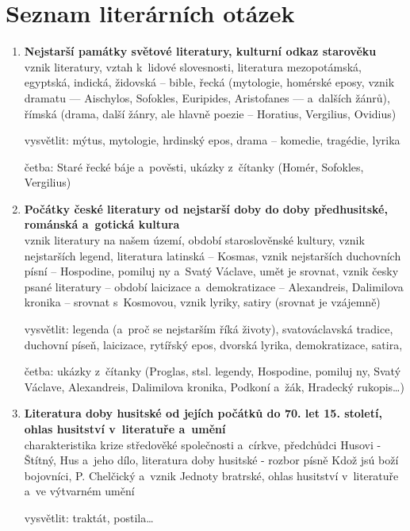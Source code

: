 \onecolumn
\chapter{Seznam literárních otázek} 
\begin{enumerate} 
\item \textbf{Nejstarší památky světové literatury, kulturní odkaz starověku} \\ 
vznik literatury, vztah k~lidové slovesnosti, literatura mezopotámská, 
egyptská, indická, židovská -- bible, řecká (mytologie, homérské eposy, 
vznik dramatu --- Aischylos, Sofokles, Euripides, Aristofanes ---
a~dalších žánrů), římská (drama, další žánry, ale hlavně poezie --
Horatius, Vergilius, Ovidius)

vysvětlit: mýtus, mytologie, hrdinský epos, drama -- komedie, tragédie, 
lyrika 

četba: Staré řecké báje a~pověsti, ukázky z~čítanky (Homér, Sofokles, 
Vergilius)

\item \textbf{Počátky české literatury od nejstarší doby do doby předhusitské, románská a~gotická kultura} \\ 
vznik literatury na našem území, období staroslověnské kultury, vznik
nejstarších legend, literatura latinská -- Kosmas, vznik  nejstarších
duchovních písní -- Hospodine, pomiluj ny a~Svatý Václave, umět je
srovnat, vznik česky psané literatury -- období laicizace a~demokratizace
-- Alexandreis, Dalimilova kronika -- srovnat s~Kosmovou, vznik lyriky, 
satiry (srovnat je vzájemně)

vysvětlit: legenda (a~proč se nejstarším říká životy), svatováclavská
tradice, duchovní píseň, laicizace, rytířský epos, dvorská
lyrika, demokratizace, satira, 

četba: ukázky z~čítanky (Proglas, stsl. legendy, Hospodine, pomiluj
ny, Svatý Václave, Alexandreis, Dalimilova kronika, Podkoní a~žák, 
Hradecký rukopis\dots )

\item \textbf{Literatura doby husitské od jejích počátků do 70. let 15. století, ohlas husitství v~literatuře a~umění} \\ 
charakteristika krize středověké společnosti a~církve, předchůdci
Husovi - Štítný, Hus a~jeho dílo, literatura doby husitské - rozbor
písně Kdož jsú boží bojovníci, P. Chelčický a~vznik Jednoty bratrské, 
ohlas husitství v~literatuře a~ve výtvarném umění

vysvětlit: traktát, postila\dots  


\end{enumerate}
